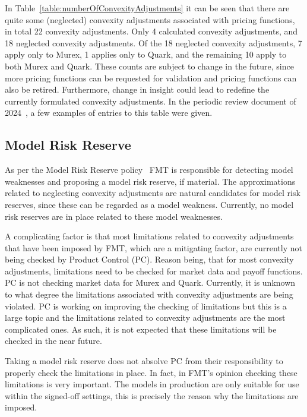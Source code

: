 \documentclass[reviewdoc]{pmv_report} %
\begin{document}
In Table~\ref{table:numberOfConvexityAdjustments} it can be seen that there are quite some (neglected) convexity adjustments associated with pricing functions, in total 22 convexity adjustments.
Only 4 calculated convexity adjustments, and 18 neglected convexity adjustments.
Of the 18 neglected convexity adjustments, 7 apply only to Murex, 1 applies only to Quark, and the remaining 10 apply to both Murex and Quark.
These counts are subject to change in the future, since more pricing functions can be requested for validation and pricing functions can also be retired.
Furthermore, change in insight could lead to redefine the currently formulated convexity adjustments.
In the periodic review document of 2024~\cite{ReviewConvexityAdjustments2024}, a few examples of entries to this table were given.

\subsection{Model Risk Reserve}
\label{sec:modelRiskReserve}

As per the Model Risk Reserve policy~\cite{PolicyModelRiskReserves} FMT is responsible for detecting model weaknesses and proposing a model risk reserve, if material.
The approximations related to neglecting convexity adjustments are natural candidates for model risk reserves, since these can be regarded as a model weakness.
Currently, no model risk reserves are in place related to these model weaknesses.

A complicating factor is that most limitations related to convexity adjustments that have been imposed by FMT, which are a mitigating factor, are currently not being checked by Product Control (PC).
Reason being, that for most convexity adjustments, limitations need to be checked for market data and payoff functions.
PC is not checking market data for Murex and Quark.
Currently, it is unknown to what degree the limitations associated with convexity adjustments are being violated.
PC is working on improving the checking of limitations but this is a large topic and the limitations related to convexity adjustments are the most complicated ones.
As such, it is not expected that these limitations will be checked in the near future.

Taking a model risk reserve does not absolve PC from their responsibility to properly check the limitations in place.
In fact, in FMT's opinion checking these limitations is very important.
The models in production are only suitable for use within the signed-off settings, this is precisely the reason why the limitations are imposed.
\end{document}
